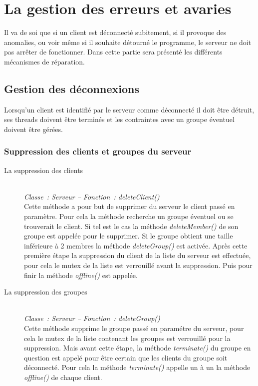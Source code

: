 \documentclass[a4paper,11pt]{report}
\begin{document}
\section{La gestion des erreurs et avaries}
  Il va de soi que si un client est déconnecté subitement, si il provoque des anomalies, ou voir même si il souhaite détourné le programme, le serveur ne doit pas arrêter de fonctionner. Dans cette partie sera présenté les différents mécanismes de réparation.

\subsection{Gestion des déconnexions}
  Lorsqu’un client est identifié par le serveur comme déconnecté il doit être détruit, ses threads doivent être terminés et les contraintes avec un groupe éventuel doivent être gérées.

\subsubsection{Suppression des clients et groupes du serveur}

\begin{description}
  \item[La suppression des clients]
  \textit{\\Classe : Serveur – Fonction : deleteClient()\\}
    Cette méthode a pour but de supprimer du serveur le client passé en paramètre. Pour cela la méthode recherche un groupe éventuel ou se trouverait le client. Si tel est le cas la méthode \textit{deleteMember()} de son groupe est appelée pour le supprimer. Si le groupe obtient une taille inférieure à 2 membres la méthode  \textit{deleteGroup()} est activée.
Après cette première étape la suppression du client de la liste du serveur est effectuée, pour cela le mutex de la liste est verrouillé avant la suppression. Puis pour finir la méthode \textit{offline()} est appelée.
   
   \item[La suppression des groupes]
   \textit{\\Classe : Serveur – Fonction : deleteGroup()\\}
   Cette méthode supprime le groupe passé en paramétre du serveur, pour cela le mutex de la liste contenant les groupes est verrouillé pour la suppression. Mais avant cette étape, la méthode \textit{terminate()} du groupe en question est appelé pour être certain que les clients du groupe soit déconnecté. Pour cela la méthode \textit{terminate()} appelle un à un la méthode \textit{offline()} de chaque client.
\end{description}
\end{document}
